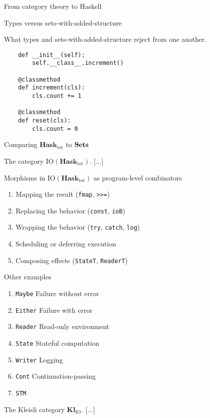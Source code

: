 \documentclass[11pt, a4paper]{article}
\begin{document}
\begin{section}{From category theory to Haskell}
\begin{subsection}{Types versus sets-with-added-structure}
\begin{subsubsection}{What types and sets-with-added-structure reject from one another.}
\begin{enumerate}
\begin{verbatim}
    def __init__(self):
        self.__class__.increment()

    @classmethod
    def increment(cls):
        cls.count += 1

    @classmethod
    def reset(cls):
        cls.count = 0
    \end{verbatim}
\end{enumerate}

\end{subsubsection}

\end{subsection}

\begin{subsection}{Comparing $\mathbf{Hask}_\text{tot}$ to $\bold{Sets}$}
\end{subsection}

\begin{subsection}{The category $\text{IO}(\mathbf{Hask}_\text{tot})$.}
[...]

\begin{subsubsection}{Morphisms in $\text{IO}(\mathbf{Hask}_{\text{tot}})$ as program-level combinators}
\begin{enumerate}
\item
Mapping the result (\texttt{fmap}, \texttt{>>=})
\item
Replacing the behavior (\texttt{const}, \texttt{ioB})
\item
Wrapping the behavior (\texttt{try}, \texttt{catch}, \texttt{log})
\item
Scheduling or deferring execution
\item
Composing effects (\texttt{StateT}, \texttt{ReaderT})
\end{enumerate}
\end{subsubsection}

\end{subsection}

\begin{subsection}{Other examples}
\begin{enumerate}
\item
\texttt{Maybe}	Failure without error
\item
\texttt{Either}	Failure with error
\item
\texttt{Reader}	Read-only environment
\item
\texttt{State}	Stateful computation
\item
\texttt{Writer}	Logging
\item
\texttt{Cont}	Continuation-passing
\item
\texttt{STM}
\end{enumerate}
\end{subsection}

\begin{subsection}{The Kleisli category $\mathbf{Kl}_\text{IO}$.}
[...]
\end{subsection}

\end{section}
\end{document}

